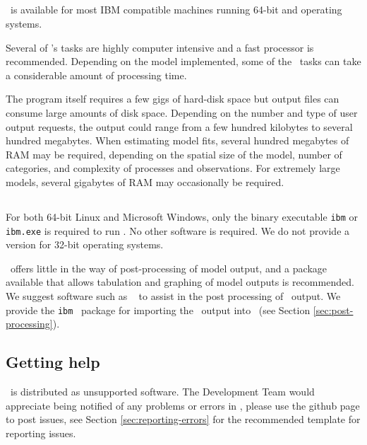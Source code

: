 \subsection{}
\IBM\ is available for most IBM compatible machines running 64-bit  and  operating systems.

Several of \IBM 's tasks are highly computer intensive and a fast processor is recommended. Depending on the model implemented, some of the \IBM\ tasks can take a considerable amount of processing time.

The program itself requires a few gigs of hard-disk space but output files can consume large amounts of disk space. Depending on the number and type of user output requests, the output could range from a few hundred kilobytes to several hundred megabytes. When estimating model fits, several hundred megabytes of RAM may be required, depending on the spatial size of the model, number of categories, and complexity of processes and observations. For extremely large models, several gigabytes of RAM may occasionally be required. 

\subsection{}

For both 64-bit Linux and Microsoft Windows, only the binary executable \texttt{ibm} or \texttt{ibm.exe} is required to run \IBM . No other software is required. We do not provide a version for 32-bit operating systems. 

\IBM\ offers little in the way of post-processing of model output, and a package available that allows tabulation and graphing of model outputs is recommended. We suggest software such as \href{http://www.r-project.org}{\R}\ \citep{R} to assist in the post processing of \IBM\ output. We provide the \texttt{ibm} \R\ package for importing the \IBM\ output into \R\ (see Section \ref{sec:post-processing}).

\subsection{Getting help}

\IBM\ is distributed as unsupported software. The Development Team would appreciate being notified of any problems or errors in \IBM , please use the github page to post issues, see Section \ref{sec:reporting-errors} for the recommended template for reporting issues.

